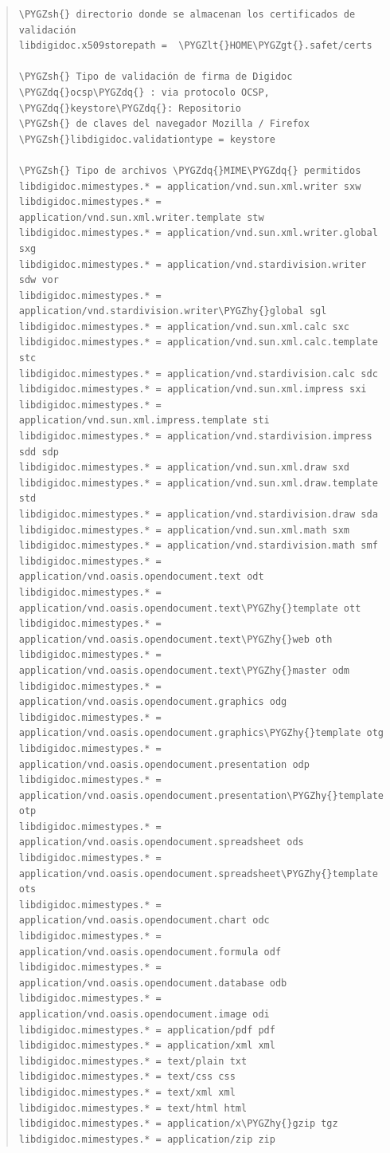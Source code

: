 \documentclass[letterpaper,11pt,spanish]{sphinxmanual}
\def\PYGZlt{\char`\<}
\def\PYGZgt{\char`\>}
\def\PYGZsh{\char`\#}
\def\PYGZhy{\char`\-}
\def\PYGZdq{\char`\"}
\begin{document}
\begin{quote}
\begin{Verbatim}[commandchars=\\\{\}]
\PYGZsh{} directorio donde se almacenan los certificados de validación
libdigidoc.x509storepath =  \PYGZlt{}HOME\PYGZgt{}.safet/certs

\PYGZsh{} Tipo de validación de firma de Digidoc \PYGZdq{}ocsp\PYGZdq{} : via protocolo OCSP, \PYGZdq{}keystore\PYGZdq{}: Repositorio
\PYGZsh{} de claves del navegador Mozilla / Firefox
\PYGZsh{}libdigidoc.validationtype = keystore

\PYGZsh{} Tipo de archivos \PYGZdq{}MIME\PYGZdq{} permitidos
libdigidoc.mimestypes.* = application/vnd.sun.xml.writer sxw
libdigidoc.mimestypes.* = application/vnd.sun.xml.writer.template stw
libdigidoc.mimestypes.* = application/vnd.sun.xml.writer.global sxg
libdigidoc.mimestypes.* = application/vnd.stardivision.writer sdw vor
libdigidoc.mimestypes.* = application/vnd.stardivision.writer\PYGZhy{}global sgl
libdigidoc.mimestypes.* = application/vnd.sun.xml.calc sxc
libdigidoc.mimestypes.* = application/vnd.sun.xml.calc.template stc
libdigidoc.mimestypes.* = application/vnd.stardivision.calc sdc
libdigidoc.mimestypes.* = application/vnd.sun.xml.impress sxi
libdigidoc.mimestypes.* = application/vnd.sun.xml.impress.template sti
libdigidoc.mimestypes.* = application/vnd.stardivision.impress sdd sdp
libdigidoc.mimestypes.* = application/vnd.sun.xml.draw sxd
libdigidoc.mimestypes.* = application/vnd.sun.xml.draw.template std
libdigidoc.mimestypes.* = application/vnd.stardivision.draw sda
libdigidoc.mimestypes.* = application/vnd.sun.xml.math sxm
libdigidoc.mimestypes.* = application/vnd.stardivision.math smf
libdigidoc.mimestypes.* = application/vnd.oasis.opendocument.text odt
libdigidoc.mimestypes.* = application/vnd.oasis.opendocument.text\PYGZhy{}template ott
libdigidoc.mimestypes.* = application/vnd.oasis.opendocument.text\PYGZhy{}web oth
libdigidoc.mimestypes.* = application/vnd.oasis.opendocument.text\PYGZhy{}master odm
libdigidoc.mimestypes.* = application/vnd.oasis.opendocument.graphics odg
libdigidoc.mimestypes.* = application/vnd.oasis.opendocument.graphics\PYGZhy{}template otg
libdigidoc.mimestypes.* = application/vnd.oasis.opendocument.presentation odp
libdigidoc.mimestypes.* = application/vnd.oasis.opendocument.presentation\PYGZhy{}template otp
libdigidoc.mimestypes.* = application/vnd.oasis.opendocument.spreadsheet ods
libdigidoc.mimestypes.* = application/vnd.oasis.opendocument.spreadsheet\PYGZhy{}template ots
libdigidoc.mimestypes.* = application/vnd.oasis.opendocument.chart odc
libdigidoc.mimestypes.* = application/vnd.oasis.opendocument.formula odf
libdigidoc.mimestypes.* = application/vnd.oasis.opendocument.database odb
libdigidoc.mimestypes.* = application/vnd.oasis.opendocument.image odi
libdigidoc.mimestypes.* = application/pdf pdf
libdigidoc.mimestypes.* = application/xml xml
libdigidoc.mimestypes.* = text/plain txt
libdigidoc.mimestypes.* = text/css css
libdigidoc.mimestypes.* = text/xml xml
libdigidoc.mimestypes.* = text/html html
libdigidoc.mimestypes.* = application/x\PYGZhy{}gzip tgz
libdigidoc.mimestypes.* = application/zip zip
\end{Verbatim}


\end{quote}
\end{document}
